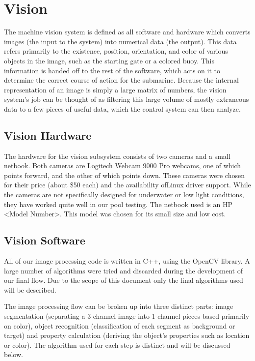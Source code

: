 \section{Vision}
The machine vision system is defined as all software and hardware which converts images (the input to the system) into numerical data (the output). This data refers primarily to the existence, position, orientation, and color of various objects in the image, such as the starting gate or a colored buoy. This information is handed off to the rest of the software, which acts on it to determine the correct course of action for the submarine. Because the internal representation of an image is simply a large matrix of numbers, the vision system's job can be thought of as filtering this large volume of mostly extraneous data to a few pieces of useful data, which the control system can then analyze.

\subsection{Vision Hardware}
The hardware for the vision subsystem consists of two cameras and a small netbook. Both cameras are Logitech Webcam 9000 Pro webcams, one of which points forward, and the other of which points down. These cameras were chosen for their price (about \$50 each) and the availability ofLinux driver support. While the cameras are not specifically designed for underwater or low light conditions, they have worked quite well in our pool testing. The netbook used is an HP <Model Number>. This model was chosen for its small size and low cost.

\subsection{Vision Software}
All of our image processing code is written in C++, using the OpenCV library. A large number of algorithms were tried and discarded during the development of our final flow.  Due to the scope of this document only the final algorithms used will be described.

The image processing flow can be broken up into three distinct parts: image segmentation (separating a 3-channel image into 1-channel pieces based primarily on color), object recognition (classification of each segment as background or target) and property calculation (deriving the object's properties such as location or color). The algorithm used for each step is distinct and will be discussed below.

